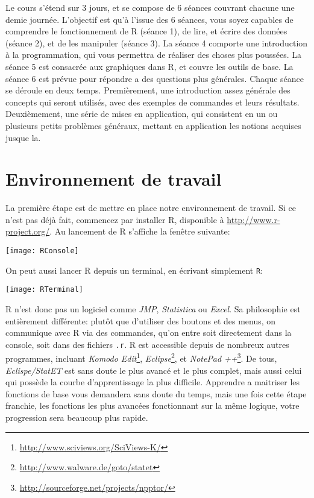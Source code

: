 Le cours s'étend sur 3 jours, et se compose de 6 séances couvrant chacune une demie journée.
L'objectif est qu'à l'issue des 6 séances, vous soyez capables de comprendre le fonctionnement de R (séance 1), de lire, et écrire des données (séance 2), et de les manipuler (séance 3).
La séance 4 comporte une introduction à la programmation, qui vous permettra de réaliser des choses plus poussées.
La séance 5 est consacrée aux graphiques dans R, et couvre les outils de base.
La séance 6 est prévue pour répondre a des questions plus générales.
Chaque séance se déroule en deux temps.
Premièrement, une introduction assez générale des concepts qui seront utilisés, avec des exemples de commandes et leurs résultats.
Deuxièmement, une série de mises en application, qui consistent en un ou plusieurs petits problèmes généraux, mettant en application les notions acquises jusque la. 

\section{Environnement de travail}

La première étape est de mettre en place notre environnement de travail.
Si ce n'est pas déjà fait, commencez par installer R, disponible à \url{http://www.r-project.org/}.
Au lancement de R s'affiche la fenêtre suivante:  

\begin{center}
\texttt{[image: RConsole]}
\end{center}

\noindent On peut aussi lancer R depuis un terminal, en écrivant simplement \texttt{R}:

\begin{center}
\texttt{[image: RTerminal]}
\end{center}

R n'est donc pas un logiciel comme \emph{JMP}, \emph{Statistica} ou \emph{Excel}.
Sa philosophie est entièrement différente: plutôt que d'utiliser des boutons et des menus, on communique avec R via des commandes, qu'on entre soit directement dans la console, soit dans des fichiers \texttt{.r}.
R est accessible depuis de nombreux autres programmes, incluant \emph{Komodo Edit}\footnote{\url{http://www.sciviews.org/SciViews-K/}}, \emph{Eclipse}\footnote{\url{http://www.walware.de/goto/statet}}, et \emph{NotePad ++}\footnote{\url{http://sourceforge.net/projects/npptor/}}.
De tous, \emph{Eclispe/StatET} est sans doute le plus avancé et le plus complet, mais aussi celui qui possède la courbe d'apprentissage la plus difficile.
Apprendre a maitriser les fonctions de base vous demandera sans doute du temps, mais une fois cette étape franchie, les fonctions les plus avancées fonctionnant sur la même logique, votre progression sera beaucoup plus rapide.

